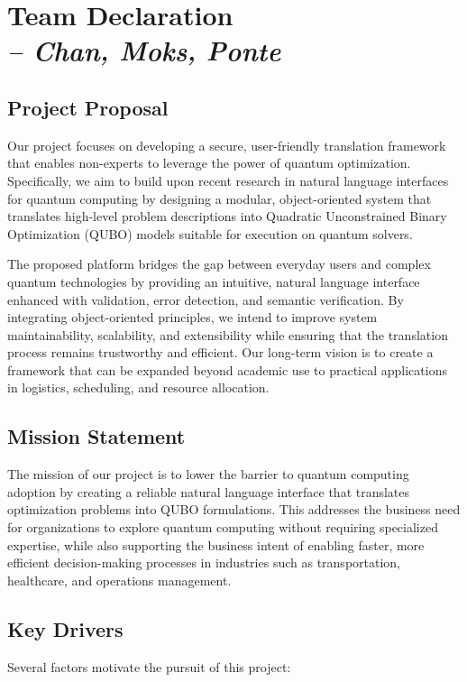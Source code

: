 \chapter{Team Declaration \\
\small{\textit{-- Chan, Moks, Ponte}}
\label{Chapter::Team Declaration}}

\section*{Project Proposal}
Our project focuses on developing a secure, user-friendly translation framework that enables non-experts to leverage the power of quantum optimization. Specifically, we aim to build upon recent research in natural language interfaces for quantum computing by designing a modular, object-oriented system that translates high-level problem descriptions into Quadratic Unconstrained Binary Optimization (\gls{QUBO}) models suitable for execution on quantum solvers. 

The proposed platform bridges the gap between everyday users and complex quantum technologies by providing an intuitive, natural language interface enhanced with validation, error detection, and semantic verification. By integrating object-oriented principles, we intend to improve system maintainability, scalability, and extensibility while ensuring that the translation process remains trustworthy and efficient. Our long-term vision is to create a framework that can be expanded beyond academic use to practical applications in logistics, scheduling, and resource allocation.

\section*{Mission Statement}
The mission of our project is to lower the barrier to quantum computing adoption by creating a reliable natural language interface that translates optimization problems into \gls{QUBO} formulations. This addresses the business need for organizations to explore quantum computing without requiring specialized expertise, while also supporting the business intent of enabling faster, more efficient decision-making processes in industries such as transportation, healthcare, and operations management.


\section*{Key Drivers}
Several factors motivate the pursuit of this project:  

